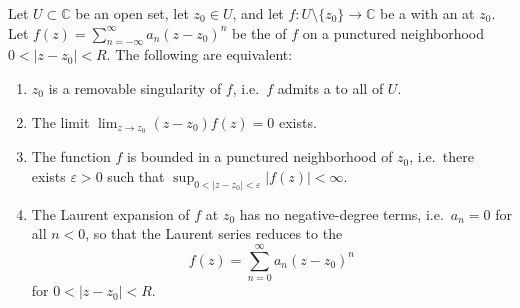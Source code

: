 \begin{theorem} \label{theorem:riemanns_theorem_on_removable_singularities}
    Let $U \subset \mathbb{C}$ be an open set, let $z_0 \in U$, and let $f : U \setminus \{z_0\} \to \mathbb{C}$ be a  with an  at $z_0$. Let $f(z) = \sum_{n=-\infty}^{\infty} a_n (z - z_0)^n$ be the  of $f$ on a punctured neighborhood $0 < |z - z_0| < R$. The following are equivalent:
    \begin{enumerate}
        \item $z_0$ is a removable singularity of $f$, i.e.\ $f$ admits a  to all of $U$.
        \item The limit $\lim_{z \to z_0} (z - z_0) f(z) = 0$ exists.
        \item The function $f$ is bounded in a punctured neighborhood of $z_0$, i.e.\ there exists $\varepsilon > 0$ such that $\sup_{0 < |z - z_0| < \varepsilon} |f(z)| < \infty$.
        \item The Laurent expansion of $f$ at $z_0$ has no negative-degree terms, i.e.\ $a_n = 0$ for all $n < 0$, so that the Laurent series reduces to the 
        $$f(z) = \sum_{n=0}^{\infty} a_n (z - z_0)^n$$
        for $0 < |z - z_0| < R$.
    \end{enumerate}
\end{theorem}


